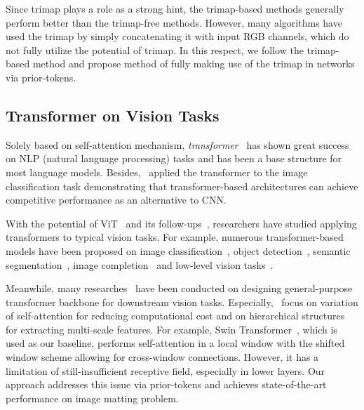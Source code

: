 \documentclass[10pt,twocolumn,letterpaper]{article}
\begin{document}
Since trimap plays a role as a strong hint, the trimap-based methods generally perform better than the trimap-free methods. However, many algorithms have used the trimap by simply concatenating it with input RGB channels, which do not fully utilize the potential of trimap. 
In this respect, we follow the trimap-based method and propose method of fully making use of the trimap in networks via prior-tokens.

\subsection{Transformer on Vision Tasks}

Solely based on self-attention mechanism, \textit{transformer}~\cite{vaswani2017attention} has shown great success on NLP (natural language processing) tasks and has been a base structure for most language models. Besides,~\cite{dosovitskiy2020image} applied the transformer to the image classification task demonstrating that transformer-based architectures can achieve competitive performance as an alternative to CNN. 

With the potential of ViT~\cite{dosovitskiy2020image} and its follow-ups~\cite{touvron2021training, yuan2021tokens, chu2021we, han2021transformer}, researchers have studied applying transformers to typical vision tasks.
For example, numerous transformer-based models have been proposed on image classification~\cite{liu2021swin, wu2020visual, li2021localvit, liu2021transformer, vaswani2021scaling, zhang2021multi, dong2021cswin, wu2021cvt, ryoo2021tokenlearner}, object detection~\cite{carion2020end, beal2020toward, liu2021swin, wang2021anchor}, semantic segmentation~\cite{zheng2021rethinking, xie2021segformer, liu2021swin}, image completion~\cite{wan2021high} and low-level vision tasks~\cite{chen2021pre, liang2021swinir, lu2021efficient}.

Meanwhile, many researches~\cite{wang2021pyramid, liu2021swin, zhang2021multi, dong2021cswin, yang2021focal, wu2021cvt} have been conducted on designing general-purpose transformer backbone for downstream vision tasks.
Especially,~\cite{liu2021swin, dong2021cswin, yang2021focal} focus on variation of self-attention for reducing computational cost and on hierarchical structures for extracting multi-scale features.
For example, Swin Transformer~\cite{liu2021swin}, which is used as our baseline, performs self-attention in a local window with the shifted window scheme allowing for cross-window connections. However, it has a limitation of still-insufficient receptive field, especially in lower layers. Our approach addresses this issue via prior-tokens and achieves state-of-the-art performance on image matting problem.
\end{document}
